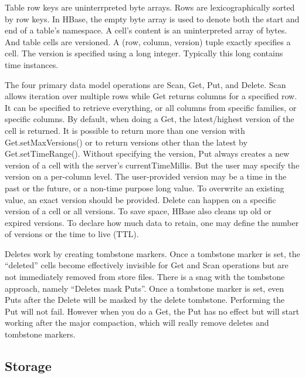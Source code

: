 \documentclass[11pt]{book}
\begin{document}
Table row keys are uninterrpreted byte arrays. Rows are lexicographically sorted by row keys. In HBase, the empty byte array is used to denote both the start and end of a table's namespace.
A cell's content is an uninterpreted array of bytes. And table cells are versioned. A (row, column, version) tuple exactly specifies a cell. The version is specified using a long integer. Typically this long contains time instances.

The four primary data model operations are Scan, Get, Put, and Delete. Scan allows iteration over multiple rows while Get returns columns for a specified row. It can be specified to retrieve everything, or all columns from specific families, or specific columns.
By default, when doing a Get, the latest/highest version of the cell is returned. It is possible to return more than one version with Get.setMaxVersions() or to return versions other than the latest by Get.setTimeRange(). Without specifying the version, Put always creates a new version of a cell with the server's currentTimeMillis. But the user may specify the version on a per-column level. The user-provided version may be a time in the past or the future, or a non-time purpose long value. To overwrite an existing value, an exact version should be provided. Delete can happen on a specific version of a cell or all versions. To save space, HBase also cleans up old or expired versions. To declare how much data to retain, one may define the number of versions or the time to live (TTL).

Deletes work by creating tombstone markers. Once a tombstone marker is set, the ``deleted'' cells become effectively invisible for Get and Scan operations but are not immediately removed from store files. There is a snag with the tombstone approach, namely ``Deletes mask Puts''. Once a tombstone marker is set, even Puts after the Delete will be masked by the delete tombstone. Performing the Put will not fail. However when you do a Get, the Put has no effect but will start working  after the major compaction, which will really remove deletes and tombstone markers.

\subsection{Storage}
\end{document}
